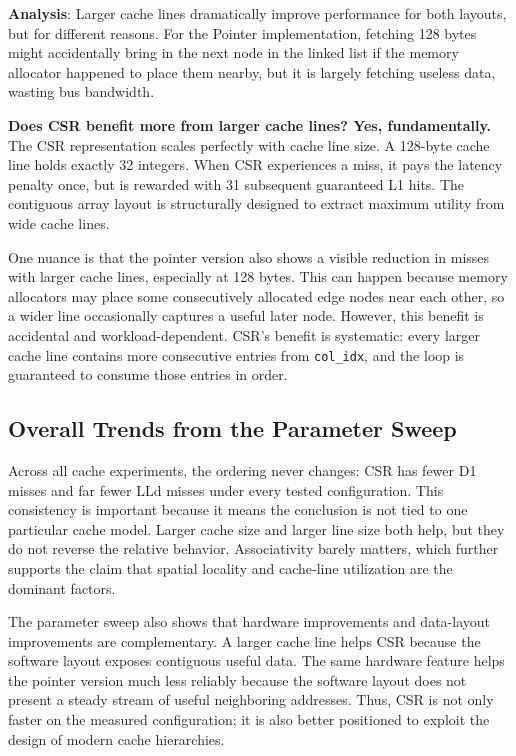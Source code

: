 \documentclass[11pt]{article}
\begin{document}
\textbf{Analysis}:
Larger cache lines dramatically improve performance for both layouts, but for different reasons. For the Pointer implementation, fetching 128 bytes might accidentally bring in the next node in the linked list if the memory allocator happened to place them nearby, but it is largely fetching useless data, wasting bus bandwidth.

\textbf{Does CSR benefit more from larger cache lines? Yes, fundamentally.} The CSR representation scales perfectly with cache line size. A 128-byte cache line holds exactly 32 integers. When CSR experiences a miss, it pays the latency penalty once, but is rewarded with 31 subsequent guaranteed L1 hits. The contiguous array layout is structurally designed to extract maximum utility from wide cache lines.

One nuance is that the pointer version also shows a visible reduction in misses with larger cache lines, especially at 128 bytes. This can happen because memory allocators may place some consecutively allocated edge nodes near each other, so a wider line occasionally captures a useful later node. However, this benefit is accidental and workload-dependent. CSR's benefit is systematic: every larger cache line contains more consecutive entries from \texttt{col\_idx}, and the loop is guaranteed to consume those entries in order.

\subsection{Overall Trends from the Parameter Sweep}

Across all cache experiments, the ordering never changes: CSR has fewer D1 misses and far fewer LLd misses under every tested configuration. This consistency is important because it means the conclusion is not tied to one particular cache model. Larger cache size and larger line size both help, but they do not reverse the relative behavior. Associativity barely matters, which further supports the claim that spatial locality and cache-line utilization are the dominant factors.

The parameter sweep also shows that hardware improvements and data-layout improvements are complementary. A larger cache line helps CSR because the software layout exposes contiguous useful data. The same hardware feature helps the pointer version much less reliably because the software layout does not present a steady stream of useful neighboring addresses. Thus, CSR is not only faster on the measured configuration; it is also better positioned to exploit the design of modern cache hierarchies.
\end{document}
